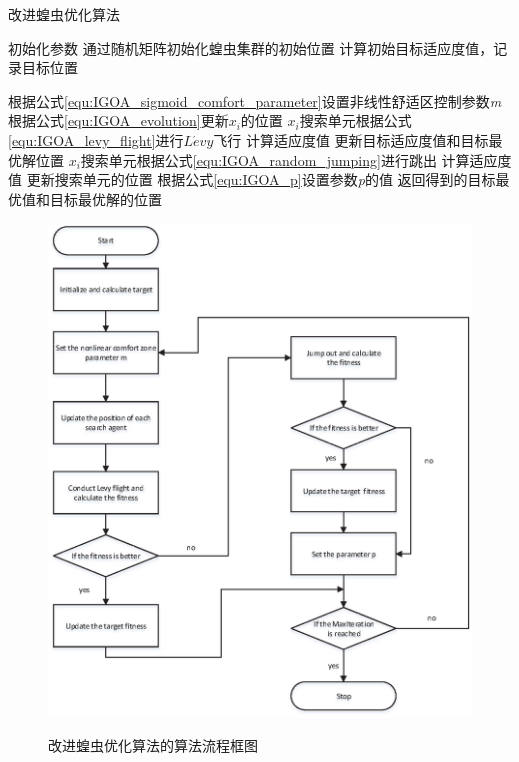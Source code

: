 \begin{algorithm}
    \caption{改进蝗虫优化算法}
    \label{alg:IGOA}
    
    \begin{algorithmic}[1]
    
    \State 初始化参数
    \State 通过随机矩阵初始化蝗虫集群的初始位置
    \State 计算初始目标适应度值，记录目标位置
    
    \State 根据公式\ref{equ:IGOA_sigmoid_comfort_parameter}设置非线性舒适区控制参数\emph{m}
    \State 根据公式\ref{equ:IGOA_evolution}更新$x_i$的位置
    \State $x_i$搜索单元根据公式\ref{equ:IGOA_levy_flight}进行$L\acute{e}vy$飞行
    \State 计算适应度值 
        \State 更新目标适应度值和目标最优解位置
    \Else
        \State $x_i$搜索单元根据公式\ref{equ:IGOA_random_jumping}进行跳出
        \State 计算适应度值
            \State 更新搜索单元的位置
        \EndIf
        \State 根据公式\ref{equ:IGOA_p}设置参数\emph{p}的值
    \EndIf
    \EndWhile
    \State 返回得到的目标最优值和目标最优解的位置
    \end{algorithmic}
\end{algorithm}

\graphicspath{{Img/}}
\begin{figure}[htbp]
    \centering
    \includegraphics[width=1\linewidth]{procedure_of_IGOA.eps}\hfill\\[0.5cm]
  \caption{改进蝗虫优化算法的算法流程框图}
  \label{fig:procedure_IGOA}
\end{figure}
